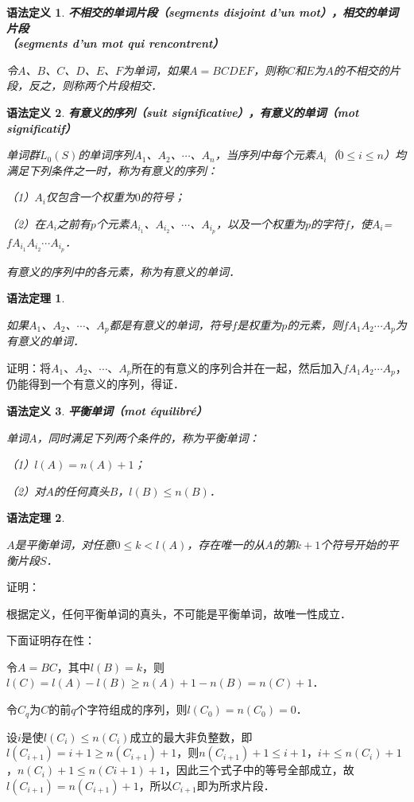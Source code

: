 \documentclass[12pt, a4paper, oneside]{book}
\newtheorem{gramdef}{语法定义}
\newtheorem{gramthe}{语法定理}
\begin{document}
			\begin{gramdef}
				\textbf{不相交的单词片段（segments disjoint d'un mot），相交的单词片段\\（segments d'un mot qui rencontrent）}
				\par
				令$A$、$B$、$C$、$D$、$E$、$F$为单词，如果$A=BCDEF$，则称$C$和$E$为$A$的不相交的片段，反之，则称两个片段相交．				
			\end{gramdef}
			
			\begin{gramdef}
				\textbf{有意义的序列（suit significative），有意义的单词（mot significatif）}
				\par
				单词群$L_0(S)$的单词序列$A_1$、$A_2$、$\cdots$、$A_n$，当序列中每个元素$A_i$（$0\leq i\leq n$）均满足下列条件之一时，称为有意义的序列：
				\par
				（1）$A_i$仅包含一个权重为$0$的符号；
				\par
				（2）在$A_i$之前有$p$个元素$A_{i_1}$、$A_{i_2}$、$\cdots$、$A_{i_p}$，以及一个权重为$p$的字符$f$，使$A_i$=\\$fA_{i_1}A_{i_2}\cdots A_{i_p}$．
				\par
				有意义的序列中的各元素，称为有意义的单词．				
			\end{gramdef}

			\begin{gramthe}\label{gramthe1}
				\hfill\par
				如果$A_1$、$A_2$、$\cdots$、$A_p$都是有意义的单词，符号$f$是权重为$p$的元素，则$fA_1A_2\cdots A_p$为有意义的单词．
			\end{gramthe}
			证明：将$A_1$、$A_2$、$\cdots$、$A_p$所在的有意义的序列合并在一起，然后加入$fA_1A_2\cdots A_p$，仍能得到一个有意义的序列，得证．
			
			\begin{gramdef}
				\textbf{平衡单词（mot équilibré）}
				\par
				单词$A$，同时满足下列两个条件的，称为平衡单词：
				\par
				（1）$l(A)=n(A)+1$；
				\par
				（2）对$A$的任何真头$B$，$l(B)\leq n(B)$．
			\end{gramdef}
			
			\begin{gramthe}\label{gramthe2}
				\hfill\par			
				$A$是平衡单词，对任意$0\leq k<l(A)$，存在唯一的从$A$的第$k+1$个符号开始的平衡片段$S$．
			\end{gramthe}			
			证明：
			\par
			根据定义，任何平衡单词的真头，不可能是平衡单词，故唯一性成立．
			\par
			下面证明存在性：
			\par
			令$A=BC$，其中$l(B)=k$，则$l(C)=l(A)-l(B)\geq n(A)+1-n(B)=n(C)+1$．
			\par
			令$C_q$为$C$的前$q$个字符组成的序列，则$l(C_0)=n(C_0)=0$．
			\par
			设$i$是使$l(C_i)\leq n(C_i)$成立的最大非负整数，即$l(C_{i+1})=i+1\geq n(C_{i+1})+1$，则$n(C_{i+1})+1\leq i+1$，$i+\leq n(C_i)+1$，$n(C_i)+1\leq n(C{i+1})+1$，因此三个式子中的等号全部成立，故$l(C_{i+1})=n(C_{i+1})+1$，所以$C_{i+1}$即为所求片段．			
			
\end{document}
